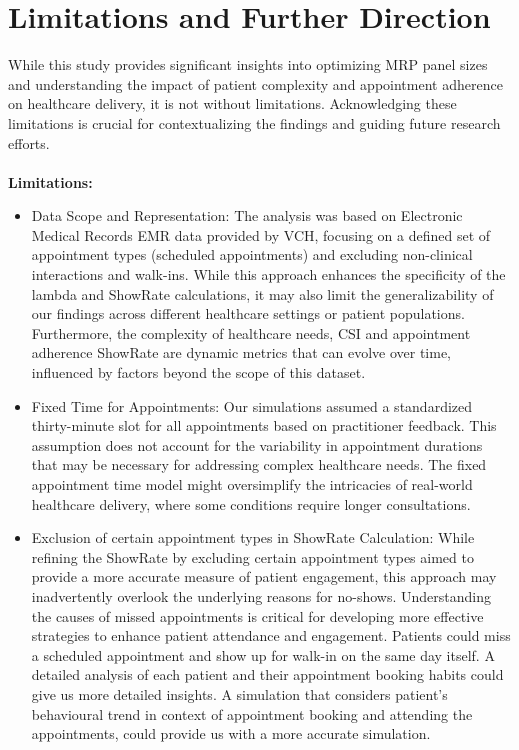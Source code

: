 \documentclass[11pt]{article}
\theoremstyle{definition}
\begin{document}
\section{Limitations and Further Direction}
While this study provides significant insights into optimizing MRP panel sizes and understanding the impact of patient complexity and appointment adherence on healthcare delivery, it is not without limitations. Acknowledging these limitations is crucial for contextualizing the findings and guiding future research efforts.\\\\

\textbf{Limitations:}

\begin{itemize}

\item Data Scope and Representation: The analysis was based on Electronic Medical Records EMR data provided by VCH, focusing on a defined set of appointment types (scheduled appointments) and excluding non-clinical interactions and walk-ins. While this approach enhances the specificity of the lambda and ShowRate calculations, it may also limit the generalizability of our findings across different healthcare settings or patient populations. Furthermore, the complexity of healthcare needs, CSI and appointment adherence ShowRate are dynamic metrics that can evolve over time, influenced by factors beyond the scope of this dataset.

\item Fixed Time for Appointments: Our simulations assumed a standardized thirty-minute slot for all appointments based on practitioner feedback. This assumption does not account for the variability in appointment durations that may be necessary for addressing complex healthcare needs. The fixed appointment time model might oversimplify the intricacies of real-world healthcare delivery, where some conditions require longer consultations.

\item Exclusion of certain appointment types in ShowRate Calculation: While refining the ShowRate by excluding certain appointment types aimed to provide a more accurate measure of patient engagement, this approach may inadvertently overlook the underlying reasons for no-shows. Understanding the causes of missed appointments is critical for developing more effective strategies to enhance patient attendance and engagement. Patients could miss a scheduled appointment and show up for walk-in on the same day itself. A detailed analysis of each patient and their appointment booking habits could give us more detailed insights. A simulation that considers patient's behavioural trend in context of appointment booking and attending the appointments, could provide us with a more accurate simulation.


\end{itemize}
\end{document}
